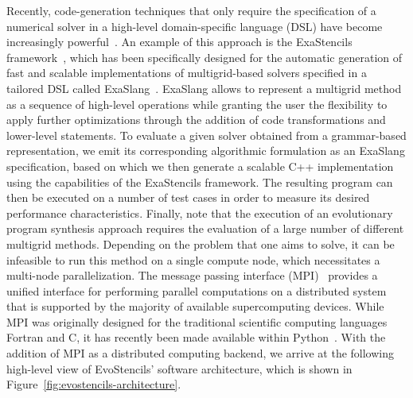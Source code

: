 Recently, code-generation techniques that only require the specification of a numerical solver in a high-level domain-specific language (DSL) have become increasingly powerful~\cite{kostler2020code}.
An example of this approach is the ExaStencils framework~\cite{lengauer2020exastencils,lengauer2014exastencils}, which has been specifically designed for the automatic generation of fast and scalable implementations of multigrid-based solvers specified in a tailored DSL called ExaSlang~\cite{schmitt2014exaslang,schmitt2016systems,kuckuk2016automatic}.
ExaSlang allows to represent a multigrid method as a sequence of high-level operations while granting the user the flexibility to apply further optimizations through the addition of code transformations and lower-level statements.
To evaluate a given solver obtained from a grammar-based representation, we emit its corresponding algorithmic formulation as an ExaSlang specification, based on which we then generate a scalable C++ implementation using the capabilities of the ExaStencils framework.
The resulting program can then be executed on a number of test cases in order to measure its desired performance characteristics.
Finally, note that the execution of an evolutionary program synthesis approach requires the evaluation of a large number of different multigrid methods.
Depending on the problem that one aims to solve, it can be infeasible to run this method on a single compute node, which necessitates a multi-node parallelization.
The message passing interface (MPI)~\cite{walker1996mpi} provides a unified interface for performing parallel computations on a distributed system that is supported by the majority of available supercomputing devices.
While MPI was originally designed for the traditional scientific computing languages Fortran and C, it has recently been made available within Python~\cite{dalcin2021mpi4py}. 
With the addition of MPI as a distributed computing backend, we arrive at the following high-level view of EvoStencils' software architecture, which is shown in Figure~\ref{fig:evostencils-architecture}.
